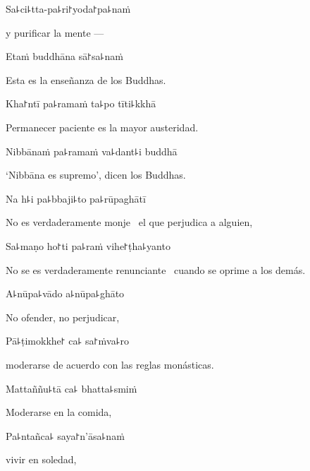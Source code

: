 	Sa꜕ci꜕tta-pa꜕ri꜓yoda꜓pa꜕naṁ
	
	\begin{english}
		y purificar la mente ---
	\end{english}
	
	Etaṁ buddhāna sā꜓sa꜕naṁ
	
	\begin{english}
		Esta es la enseñanza de los Buddhas.
	\end{english}


Kha꜓ntī pa꜕ramaṁ ta꜕po tīti꜕kkhā

\begin{english}
  Permanecer paciente es la mayor austeridad.
\end{english}

Nibbānaṁ pa꜕ramaṁ va꜕dant꜕i buddhā

\begin{english}
  ‘Nibbāna es supremo’, dicen los Buddhas.
\end{english}

Na h꜕i pa꜕bbaji꜕to pa꜕rūpaghātī

\begin{english}
  No es verdaderamente monje \pause\ el que perjudica a alguien,
\end{english}

Sa꜕maṇo ho꜓ti pa꜕raṁ vihe꜓ṭha꜕yanto

\begin{english}
  No se es verdaderamente renunciante \pause\ cuando se oprime a los demás.
\end{english}

A꜕nūpa꜕vādo a꜕nūpa꜕ghāto

\begin{english}
  No ofender, no perjudicar,
\end{english}

Pā꜕ṭimokkhe꜓ ca꜕ sa꜓ṁva꜕ro

\begin{english}
  moderarse de acuerdo con las reglas monásticas.
\end{english}

Mattaññu꜕tā ca꜕ bhatta꜕smiṁ

\begin{english}
  Moderarse en la comida,
\end{english}

Pa꜕ntañca꜕ saya꜓n'āsa꜕naṁ

\begin{english}
  vivir en soledad,
\end{english}


